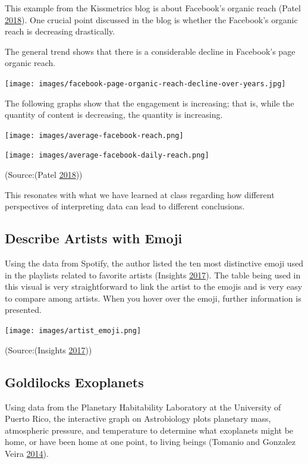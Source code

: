 \documentclass[]{book}
\begin{document}
This example from the Kissmetrics blog is about Facebook's organic reach (Patel \protect\hyperlink{ref-facebook_organic}{2018}). One crucial point discussed in the blog is whether the Facebook's organic reach is decreasing drastically.

The general trend shows that there is a considerable decline in Facebook's page organic reach.

\texttt{[image: images/facebook-page-organic-reach-decline-over-years.jpg]}

The following graphs show that the engagement is increasing; that is, while the quantity of content is decreasing, the quantity is increasing.

\texttt{[image: images/average-facebook-reach.png]}

\texttt{[image: images/average-facebook-daily-reach.png]}

(Source:(Patel \protect\hyperlink{ref-facebook_organic}{2018}))

This resonates with what we have learned at class regarding how different perspectives of interpreting data can lead to different conclusions.

\hypertarget{describe-artists-with-emoji}{%
\subsection{Describe Artists with Emoji}\label{describe-artists-with-emoji}}

Using the data from Spotify, the author listed the ten most distinctive emoji used in the playlists related to favorite artists (Insights \protect\hyperlink{ref-artist_emoji}{2017}). The table being used in this visual is very straightforward to link the artist to the emojis and is very easy to compare among artists. When you hover over the emoji, further information is presented.

\texttt{[image: images/artist\_emoji.png]}

(Source:(Insights \protect\hyperlink{ref-artist_emoji}{2017}))

\hypertarget{goldilocks-exoplanets}{%
\subsection{Goldilocks Exoplanets}\label{goldilocks-exoplanets}}

Using data from the Planetary Habitability Laboratory at the University of Puerto Rico, the interactive graph on Astrobiology plots planetary mass, atmospheric pressure, and temperature to determine what exoplanets might be home, or have been home at one point, to living beings (Tomanio and Gonzalez Veira \protect\hyperlink{ref-goldilocks_worlds}{2014}).
\end{document}
